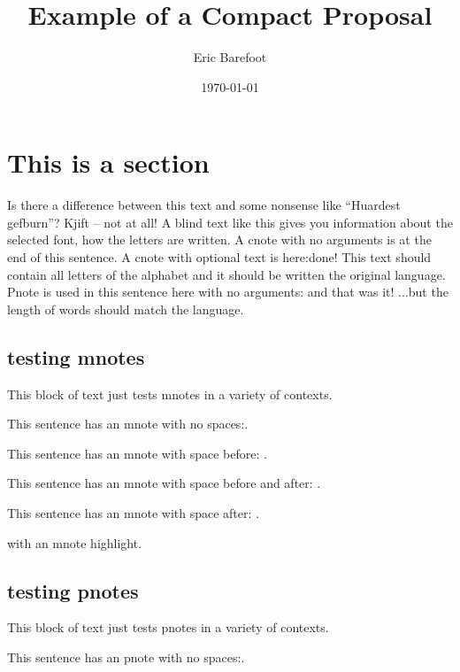 \documentclass[draft, nonotes]{compact_proposal}
\title{Example of a Compact Proposal}
\author{Eric Barefoot}
\date{\today}
\begin{document}
\maketitle

\section{This is a section}
Is there a difference between this text and some nonsense like ``Huardest gefburn''? Kjift – not at all!
A blind text like this gives you information about the  selected font, how the letters are written. A cnote with no arguments is at the end of this sentence\cnote.
A cnote with optional text is here: done!
This text should contain all letters of the alphabet and it should be written  the original language.
Pnote is used in this sentence here with no arguments: \pnote and that was it! ...but the length of words  should match the language.

\subsection{testing mnotes}

This block of text just tests mnotes in a variety of contexts.

This sentence has an mnote with no spaces:.

This sentence has an mnote with space before: .

This sentence has an mnote with space before and after:  .

This sentence has an mnote with space after: .

 with an mnote highlight.

\subsection{testing pnotes}

This block of text just tests pnotes in a variety of contexts.

This sentence has an pnote with no spaces:.
\end{document}
